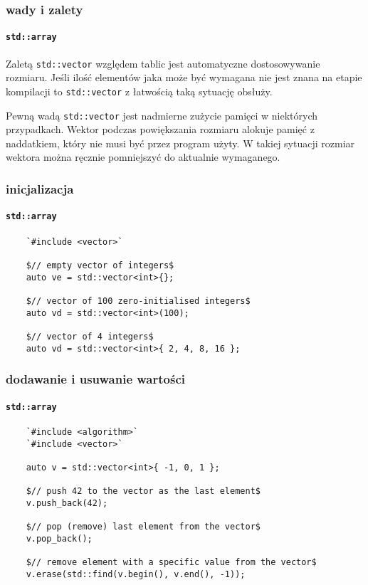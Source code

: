 \documentclass[aspectratio=169]{beamer}
\begin{document}
\begin{frame}
    \frametitle{wady i zalety}
    \framesubtitle{{\tt std::array}}

    Zaletą {\tt std::vector} względem tablic jest automatyczne dostosowywanie
    rozmiaru. Jeśli ilość elementów jaka może być wymagana nie jest znana na
    etapie kompilacji to {\tt std::vector} z łatwością taką sytuację obsłuży.

    \vspace{1em}

    Pewną wadą {\tt std::vector} jest nadmierne zużycie pamięci w niektórych
    przypadkach. Wektor podczas powiększania rozmiaru alokuje pamięć z
    naddatkiem, który nie musi być przez program użyty. W takiej sytuacji
    rozmiar wektora można ręcznie pomniejszyć do aktualnie wymaganego.
\end{frame}

\begin{frame}[fragile]
    \frametitle{inicjalizacja}
    \framesubtitle{{\tt std::array}}

    {\footnotesize
    \begin{lstlisting}
    `#include <vector>`

    $// empty vector of integers$
    auto ve = std::vector<int>{};

    $// vector of 100 zero-initialised integers$
    auto vd = std::vector<int>(100);

    $// vector of 4 integers$
    auto vd = std::vector<int>{ 2, 4, 8, 16 };
    \end{lstlisting}}
\end{frame}

\begin{frame}[fragile]
    \frametitle{dodawanie i usuwanie wartości}
    \framesubtitle{{\tt std::array}}

    {\footnotesize
    \begin{lstlisting}
    `#include <algorithm>`
    `#include <vector>`

    auto v = std::vector<int>{ -1, 0, 1 };

    $// push 42 to the vector as the last element$
    v.push_back(42);

    $// pop (remove) last element from the vector$
    v.pop_back();

    $// remove element with a specific value from the vector$
    v.erase(std::find(v.begin(), v.end(), -1));
    \end{lstlisting}}
\end{frame}
\end{document}
